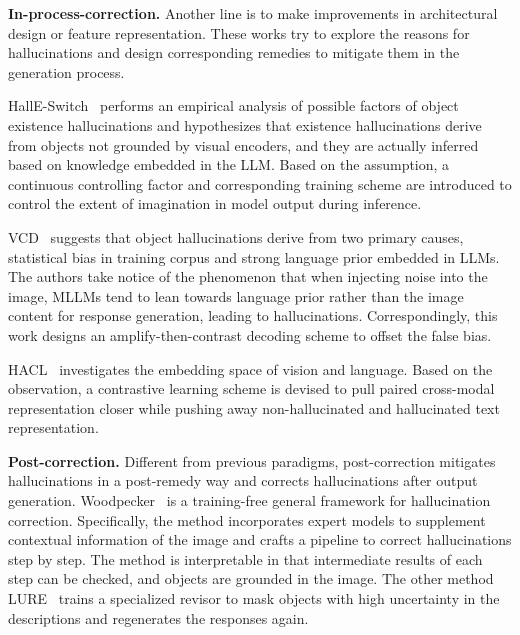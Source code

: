 \noindent \textbf{In-process-correction.}
Another line is to make improvements in architectural design or feature representation. These works try to explore the reasons for hallucinations and design corresponding remedies to mitigate them in the generation process.

HallE-Switch~\cite{zhai2023halle} performs an empirical analysis of possible factors of object existence hallucinations and hypothesizes that existence hallucinations derive from objects not grounded by visual encoders, and they are actually inferred based on knowledge embedded in the LLM. Based on the assumption, a continuous controlling factor and corresponding training scheme are introduced to control the extent of imagination in model output during inference. 

VCD~\cite{leng2023mitigating} suggests that object hallucinations derive from two primary causes, \ie statistical bias in training corpus and strong language prior embedded in LLMs. The authors take notice of the phenomenon that when injecting noise into the image, MLLMs tend to lean towards language prior rather than the image content for response generation, leading to hallucinations. Correspondingly, this work designs an amplify-then-contrast decoding scheme to offset the false bias.

HACL~\cite{jiang2023hallucination} investigates the embedding space of vision and language. Based on the observation, a contrastive learning scheme is devised to pull paired cross-modal representation closer while pushing away non-hallucinated and hallucinated text representation.

\noindent \textbf{Post-correction.}
Different from previous paradigms, post-correction mitigates hallucinations in a post-remedy way and corrects hallucinations after output generation. 
Woodpecker~\cite{yin2023woodpecker} is a training-free general framework for hallucination correction. Specifically, the method incorporates expert models to supplement contextual information of the image and crafts a pipeline to correct hallucinations step by step. The method is interpretable in that intermediate results of each step can be checked, and objects are grounded in the image. 
The other method LURE~\cite{zhou2023analyzing} trains a specialized revisor to mask objects with high uncertainty in the descriptions and regenerates the responses again.
